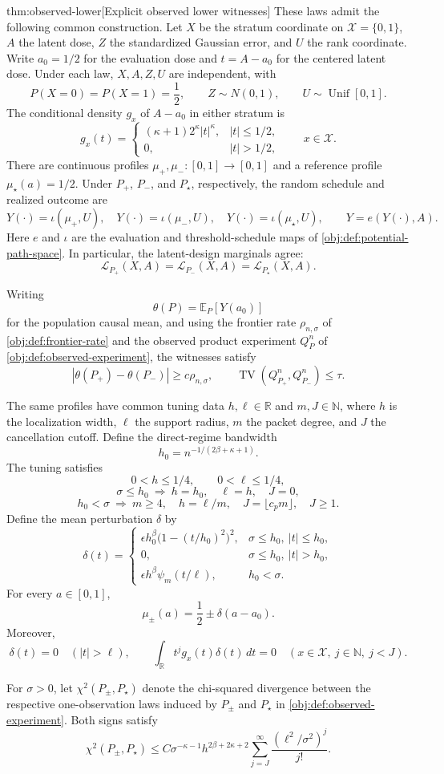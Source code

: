 \documentclass[11pt]{article}
\begin{document}
\begin{theoremv}{thm:observed-lower}[Explicit observed lower witnesses]
These laws admit the following common construction. Let \(X\) be the stratum coordinate on \(\mathcal X=\{0,1\}\), \(A\) the latent dose, \(Z\) the standardized Gaussian error, and \(U\) the rank coordinate. Write \(a_0=1/2\) for the evaluation dose and \(t=A-a_0\) for the centered latent dose. Under each law, \(X,A,Z,U\) are independent, with
\[
P(X=0)=P(X=1)=\frac12,\qquad
Z\sim N(0,1),\qquad U\sim\operatorname{Unif}[0,1].
\]
The conditional density \(g_x\) of \(A-a_0\) in either stratum is
\[
g_x(t)=
\begin{cases}
(\kappa+1)2^\kappa|t|^\kappa,& |t|\le1/2,\\
0,& |t|>1/2,
\end{cases}
\qquad x\in\mathcal X.
\]
There are continuous profiles \(\mu_+,\mu_-:[0,1]\to[0,1]\) and a reference profile \(\mu_\star(a)=1/2\). Under \(P_+\), \(P_-\), and \(P_\star\), respectively, the random schedule and realized outcome are
\[
Y(\cdot)=\iota(\mu_+,U),\quad
Y(\cdot)=\iota(\mu_-,U),\quad
Y(\cdot)=\iota(\mu_\star,U),
\qquad
Y=e(Y(\cdot),A).
\]
Here \(e\) and \(\iota\) are the evaluation and threshold-schedule maps of \cref{obj:def:potential-path-space}. In particular, the latent-design marginals agree:
\[
\mathcal L_{P_+}(X,A)=
\mathcal L_{P_-}(X,A)=
\mathcal L_{P_\star}(X,A).
\]

Writing
\[
\theta(P)=\mathbb E_P[Y(a_0)]
\]
for the population causal mean, and using the frontier rate \(\rho_{n,\sigma}\) of \cref{obj:def:frontier-rate} and the observed product experiment \(Q_P^n\) of \cref{obj:def:observed-experiment}, the witnesses satisfy
\[
|\theta(P_+)-\theta(P_-)|\ge c\rho_{n,\sigma},
\qquad
\operatorname{TV}(Q_{P_+}^n,Q_{P_-}^n)\le\tau.
\]

The same profiles have common tuning data \(h,\ell\in\mathbb R\) and \(m,J\in\mathbb N\), where \(h\) is the localization width, \(\ell\) the support radius, \(m\) the packet degree, and \(J\) the cancellation cutoff. Define the direct-regime bandwidth
\[
h_0=n^{-1/(2\beta+\kappa+1)}.
\]
The tuning satisfies
\[
0<h\le1/4,\qquad 0<\ell\le1/4,
\]
\[
\sigma\le h_0\ \Longrightarrow\
h=h_0,\quad \ell=h,\quad J=0,
\]
\[
h_0<\sigma\ \Longrightarrow\
m\ge4,\quad h=\ell/m,\quad
J=\lfloor c_pm\rfloor,\quad J\ge1.
\]
Define the mean perturbation \(\delta\) by
\[
\delta(t)=
\begin{cases}
\epsilon h_0^\beta\bigl(1-(t/h_0)^2\bigr)^2,
  &\sigma\le h_0,\ |t|\le h_0,\\
0,&\sigma\le h_0,\ |t|>h_0,\\
\epsilon h^\beta\psi_m(t/\ell),&h_0<\sigma.
\end{cases}
\]
For every \(a\in[0,1]\),
\[
\mu_\pm(a)=\frac12\pm\delta(a-a_0).
\]
Moreover,
\[
\delta(t)=0\quad(|t|>\ell),
\qquad
\int_{\mathbb R}t^jg_x(t)\delta(t)\,dt=0
\quad(x\in\mathcal X,\ j\in\mathbb N,\ j<J).
\]

For \(\sigma>0\), let \(\chi^2(P_\pm,P_\star)\) denote the chi-squared divergence between the respective one-observation laws induced by \(P_\pm\) and \(P_\star\) in \cref{obj:def:observed-experiment}. Both signs satisfy
\[
\chi^2(P_\pm,P_\star)
\le
C\sigma^{-\kappa-1}h^{2\beta+2\kappa+2}
\sum_{j=J}^{\infty}\frac{(\ell^2/\sigma^2)^j}{j!}.
\]
\end{theoremv}
\end{document}
